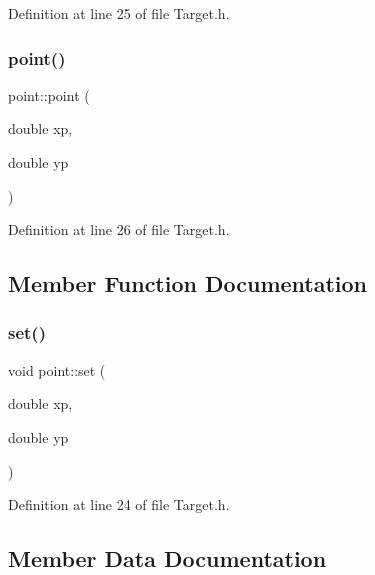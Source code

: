 Definition at line 25 of file Target.\+h.

\mbox{\label{classpoint_a35a81eb47d874ab0ad36577aad5fc464}} 
\subsubsection{\texorpdfstring{point()}{point()}\hspace{0.1cm}{\footnotesize\ttfamily [2/2]}}
{\footnotesize\ttfamily point\+::point (\begin{DoxyParamCaption}\item[{double}]{xp,  }\item[{double}]{yp }\end{DoxyParamCaption})\hspace{0.3cm}{\ttfamily [inline]}}



Definition at line 26 of file Target.\+h.



\subsection{Member Function Documentation}
\mbox{\label{classpoint_a55ff7a33caa2783f318bc5f65746e32e}} 
\subsubsection{\texorpdfstring{set()}{set()}}
{\footnotesize\ttfamily void point\+::set (\begin{DoxyParamCaption}\item[{double}]{xp,  }\item[{double}]{yp }\end{DoxyParamCaption})\hspace{0.3cm}{\ttfamily [inline]}}



Definition at line 24 of file Target.\+h.



\subsection{Member Data Documentation}
\mbox{\label{classpoint_a9c6b34deaf4900ad4193c17935fd384a}} 
